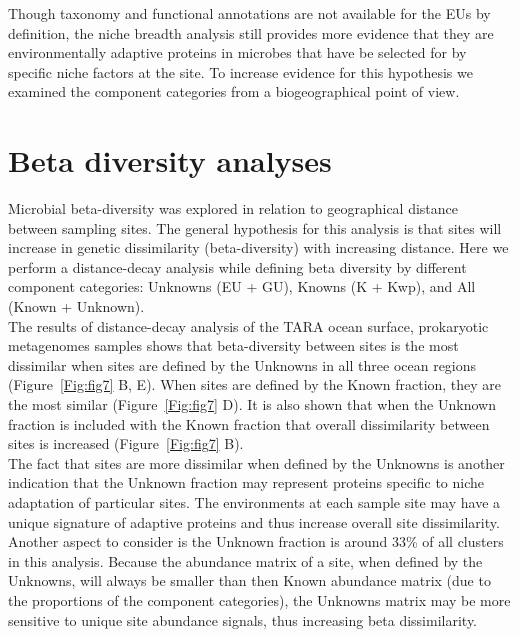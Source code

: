 Though taxonomy and functional annotations are not available for the EUs by definition, the niche breadth analysis still provides more evidence that they are environmentally adaptive proteins in microbes that have be selected for by specific niche factors at the site. To increase evidence for this hypothesis we examined the component categories from a biogeographical point of view. \\

\section{Beta diversity analyses}

Microbial beta-diversity was explored in relation to geographical distance between sampling sites. The general hypothesis for this analysis is that sites will increase in genetic dissimilarity (beta-diversity) with increasing distance. Here we perform a distance-decay analysis while defining beta diversity by different component categories: Unknowns (EU + GU), Knowns (K + Kwp), and All (Known + Unknown). \\

The results of distance-decay analysis of the TARA ocean surface, prokaryotic metagenomes samples shows that beta-diversity between sites is the most dissimilar when sites are defined by the Unknowns in all three ocean regions (Figure~\ref{Fig:fig7} B, E). When sites are defined by the Known fraction, they are the most similar (Figure~\ref{Fig:fig7} D). It is also shown that when the Unknown fraction is included with the Known fraction that overall dissimilarity between sites is increased (Figure~\ref{Fig:fig7} B). \\

The fact that sites are more dissimilar when defined by the Unknowns is another indication that the Unknown fraction may represent proteins specific to niche adaptation of particular sites. The environments at each sample site may have a unique signature of adaptive proteins and thus increase overall site dissimilarity. Another aspect to consider is the Unknown fraction is around 33\% of all clusters in this analysis. Because the abundance matrix of a site, when defined by the Unknowns, will always be smaller than then Known abundance matrix (due to the proportions of the component categories), the Unknowns matrix may be more sensitive to unique site abundance signals, thus increasing beta dissimilarity.\\

